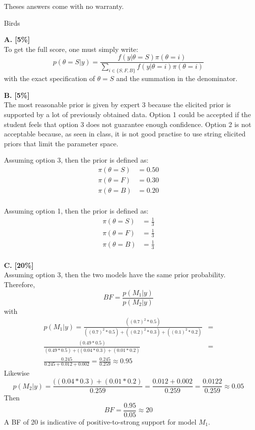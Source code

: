 \documentclass{article}
\begin{document}
Theses answers come with no warranty.

Birds

\textbf{A. [5\%]}\\

To get the full score, one must simply write:
\begin{equation*}
        p(\theta=S|y) = \frac{f(y|\theta=S)\pi(\theta=i)}{\sum_{i \in \{S,F,B\}}f(y|\theta=i)\pi(\theta=i)}
\end{equation*}
with the exact specification of $\theta=S$ and the summation in the denominator.

\textbf{B. [5\%]}\\

The most reasonable prior is given by expert 3 because the elicited prior is supported by a lot of previously obtained data.
Option 1 could be accepted if the student feels that option 3 does not guarantee enough confidence.
Option 2 is not acceptable because, as seen in class, it is not good practise to use string elicited priors that limit the parameter space.

Assuming option 3, then the prior is defined as:
\begin{align*}
\pi(\theta=S) &= 0.50\\
\pi(\theta=F) &= 0.30\\
\pi(\theta=B) &= 0.20\\
\end{align*}

Assuming option 1, then the prior is defined as:
\begin{align*}
\pi(\theta=S) &= \frac{1}{3}\\
\pi(\theta=F) &= \frac{1}{3}\\
\pi(\theta=B) &= \frac{1}{3}\\
\end{align*}

\textbf{C. [20\%]}\\

Assuming option 3, then the two models have the same prior probability.
Therefore,
\begin{equation*}
BF = \frac{p(M_1|y)}{p(M_2|y)}
\end{equation*}
with
\begin{align*}
        p(M_1|y) = \frac{((0.7)^2 * 0.5)}{((0.7)^2 * 0.5) + ((0.2)^2 * 0.3) + ((0.1)^2 * 0.2)} &=\\ \frac{(0.49 * 0.5)}{(0.49 * 0.5) + ((0.04 * 0.3) + (0.01 * 0.2)} &=\\ \frac{0.245}{0.245 + 0.012 + 0.002} = \frac{0.245}{0.259} \approx 0.95
\end{align*}
Likewise
\begin{equation*}
        p(M_2|y) = \frac{ ((0.04 * 0.3) + (0.01 * 0.2)}{0.259} =  \frac{0.012 + 0.002}{0.259} = \frac{0.0122}{0.259} \approx 0.05
\end{equation*}
Then
\begin{equation*}
BF = \frac{0.95}{0.05} \approx 20
\end{equation*}
A BF of 20 is indicative of positive-to-strong support for model $M_1$.
\end{document}
